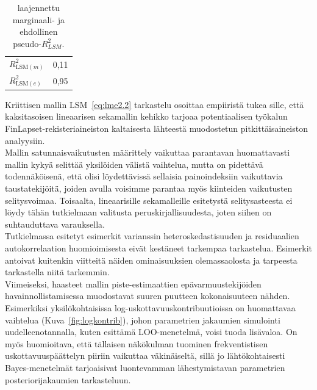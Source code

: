 \documentclass[finnish]{docopts}
\begin{document}
\begin{table}[H]
\centering
\begin{tabular}{lr}
\toprule
$R^2_{\text{LSM}(m)}$ & 0,11\\
$R^2_{\text{LSM}(e)}$ & 0,95\\
\bottomrule
\end{tabular}
\caption{\cite{johnson14} laajennettu marginaali- ja ehdollinen  pseudo-$R^2_{LSM}$.}
\label{table:r2}
\end{table}

Kriittisen mallin $\text{LSM}$~\ref{eq:lme2.2} tarkastelu osoittaa empiiristä tukea sille, että \cite{laird82} kaksitasoisen lineaarisen sekamallin kehikko tarjoaa potentiaalisen työkalun FinLapset-rekisteriaineiston kaltaisesta lähteestä muodostetun pitkittäisaineiston analyysiin.\\

Mallin satunnaisvaikutusten määrittely vaikuttaa parantavan huomattavasti mallin kykyä selittää yksilöiden välistä vaihtelua, mutta on pidettävä todennäköisenä, että olisi löydettävissä sellaisia painoindeksiin vaikuttavia taustatekijöitä, joiden avulla voisimme parantaa myös kiinteiden vaikutusten selitysvoimaa. Toisaalta, lineaarisille sekamalleille esitetystä selitysasteesta ei löydy tähän tutkielmaan valitusta peruskirjallisuudesta, joten siihen on suhtauduttava varauksella.\\

Tutkielmassa esitetyt esimerkit varianssin heteroskedastisuuden ja residuaalien autokorrelaation huomioimisesta eivät kestäneet tarkempaa tarkastelua. Esimerkit antoivat kuitenkin viitteitä näiden ominaisuuksien olemassaolosta ja tarpeesta tarkastella niitä tarkemmin.\\

Viimeiseksi, haasteet mallin piste-estimaattien epävarmuustekijöiden havainnollistamisessa muodostavat suuren puutteen kokonaisuuteen nähden. Esimerkiksi yksilökohtaisissa log-uskottavuuskontribuutioissa on huomattavaa vaihtelua (Kuva~\ref{fig:logkontrib}), johon parametrien jakaumien simulointi uudelleenotannalla, kuten \cite{burzykowski13} esittämä LOO-menetelmä, voisi tuoda lisävaloa. On myös huomioitava, että tällaisen näkökulman tuominen frekventistisen uskottavuuspäättelyn piiriin vaikuttaa väkinäiseltä, sillä jo lähtökohtaisesti Bayes-menetelmät tarjoaisivat luontevamman lähestymistavan parametrien posteriorijakaumien tarkasteluun.\\
\end{document}
